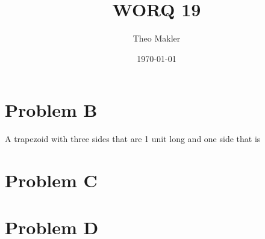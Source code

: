 \documentclass[a4paper]{article}
\title{WORQ 19}
\author{Theo Makler}
\date{\today}
\begin{document}
\maketitle

\section{Problem B}
A trapezoid with three sides that are 1 unit long and one side that is 
\section{Problem C}

\section{Problem D}
\end{document}
